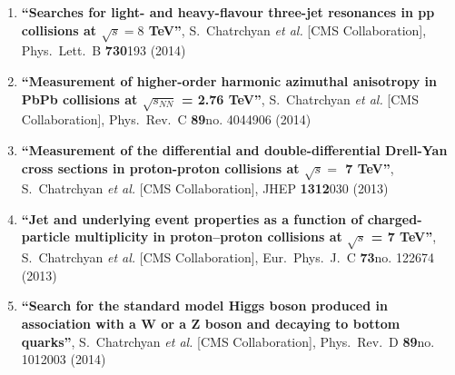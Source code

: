 \begin{enumerate}
\item%
{\bf ``Searches for light- and heavy-flavour three-jet resonances in pp collisions at $\sqrt{s} = 8$ TeV''}, 
  S.~Chatrchyan {\it et al.}  [CMS Collaboration], 
Phys.\ Lett.\ B {\bf 730}193 (2014) %


\item%
{\bf ``Measurement of higher-order harmonic azimuthal anisotropy in PbPb collisions at $\sqrt{s_{NN}}$ = 2.76 TeV''}, 
  S.~Chatrchyan {\it et al.}  [CMS Collaboration], 
Phys.\ Rev.\ C {\bf 89}no. 4044906 (2014) %


\item%
{\bf ``Measurement of the differential and double-differential Drell-Yan cross sections in proton-proton collisions at $\sqrt{s} =$ 7 TeV''}, 
  S.~Chatrchyan {\it et al.}  [CMS Collaboration], 
JHEP {\bf 1312}030 (2013) %


\item%
{\bf ``Jet and underlying event properties as a function of charged-particle multiplicity in proton–proton collisions at $\sqrt{s}$ = 7 TeV''}, 
  S.~Chatrchyan {\it et al.}  [CMS Collaboration], 
Eur.\ Phys.\ J.\ C {\bf 73}no. 122674 (2013) %


\item%
{\bf ``Search for the standard model Higgs boson produced in association with a W or a Z boson and decaying to bottom quarks''}, 
  S.~Chatrchyan {\it et al.}  [CMS Collaboration], 
Phys.\ Rev.\ D {\bf 89}no. 1012003 (2014) %



\end{enumerate}
